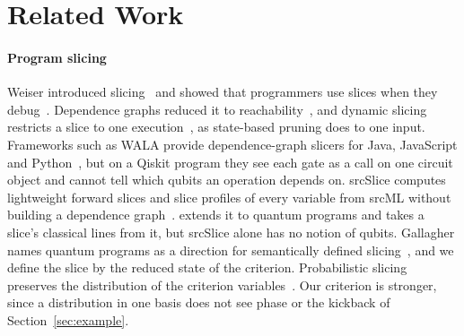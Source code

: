 \section{Related Work}\label{sec:related}

\paragraph*{Program slicing}
Weiser introduced slicing~\cite{weiser1984program} and showed that programmers use slices when they
debug~\cite{weiser1982programmers}. Dependence graphs reduced it to
reachability~\cite{ottenstein1984pdg, ferrante1987pdg, horwitz1990interprocedural}, and dynamic slicing
restricts a slice to one execution~\cite{korel1988dynamic, agrawal1990dynamic}, as state-based pruning does
to one input. Frameworks such as WALA provide dependence-graph slicers for Java, JavaScript
and Python~\cite{wala}, but on a Qiskit program they see each gate as a call on one circuit object and cannot
tell which qubits an operation depends on. srcSlice computes lightweight forward slices and slice profiles of every variable from srcML without
building a dependence graph~\cite{alomari2014srcslice}. \tool{} extends it to quantum programs and takes a slice's
classical lines from it, but srcSlice alone has no notion of qubits. Gallagher names quantum programs as a direction for semantically
defined slicing~\cite{gallagher2025program}, and we define the slice by the reduced state of the criterion. Probabilistic slicing preserves the distribution of the criterion
variables~\cite{hur2014slicing, amtoft2020theory, olmedo2025slicing}. Our criterion is stronger, since a
distribution in one basis does not see phase or the kickback of Section~\ref{sec:example}.

